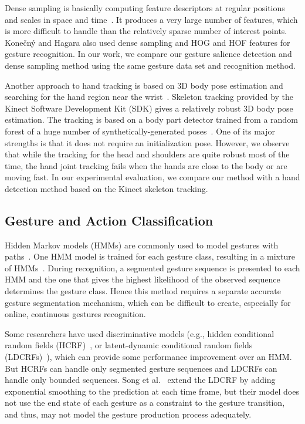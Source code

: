 \documentclass{sigchi}
\begin{document}
Dense sampling is basically computing feature descriptors at regular positions and scales in space and time~\cite{wang-spatio-2009}.
It produces a very large number of features, which is more difficult to handle than the relatively sparse number of interest points.
Kone\v{c}n\'{y} and Hagara also used dense sampling and HOG and HOF features for gesture recognition. In our work, we compare our gesture salience detection and 
dense sampling method using the same gesture data set and recognition method. 

Another approach to hand tracking is based on 3D body pose estimation and searching for the hand region near the wrist~\cite{SongDD2011b}.
Skeleton tracking provided by the Kinect Software Development Kit (SDK) gives a relatively robust 3D body pose estimation. The tracking
is based on a body part detector trained from a random forest of a huge number of synthetically-generated poses~\cite{Shotton:2011}. One of its
major strengths is that it does not require an initialization pose. However, we observe that while the tracking for the head and shoulders are quite 
robust most of the time, the hand joint tracking fails when the hands are close to the body or are moving fast. In our experimental evaluation, we
 compare our method with a hand detection method based on the Kinect skeleton tracking.

\subsection{Gesture and Action Classification}
Hidden Markov models (HMMs) are commonly used
to model gestures with paths~\cite{sharma00, Starner95}. 
One HMM model is trained for each gesture class, resulting in a mixture of HMMs~\cite{yin10}. During
recognition, a segmented gesture sequence is presented to each HMM and the one that gives the highest
likelihood of the observed sequence determines the gesture class. Hence this method requires
a separate accurate gesture segmentation mechanism, which can be difficult to create, especially for online, continuous gestures
recognition.

Some researchers have used discriminative models (e.g., hidden conditional 
random fields (HCRF)~\cite{wang06}, or latent-dynamic conditional random fields (LDCRFs)~\cite{morency07}), which can provide some 
performance improvement over an HMM. But HCRFs
can handle only segmented gesture sequences and LDCRFs can handle only bounded sequences. Song et al.~\cite{song12} extend the LDCRF by 
adding exponential smoothing to the prediction at each time frame, but their model does not
use the end state of each gesture as a constraint to the gesture transition, and thus, may not
model the gesture production process adequately.  
\end{document}
